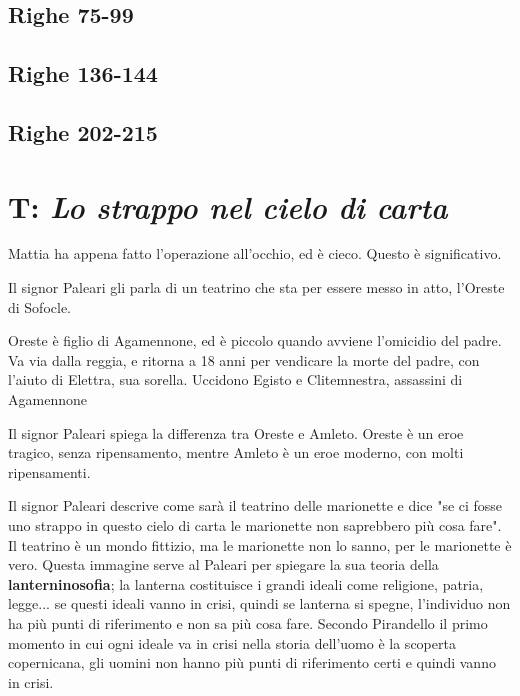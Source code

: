 \subsection{Righe 75-99}

\subsection{Righe 136-144}

\subsection{Righe 202-215}

\section{T: \textit{Lo strappo nel cielo di carta}}

Mattia ha appena fatto l’operazione all’occhio, ed è cieco. Questo è significativo.

Il signor Paleari gli parla di un teatrino che sta per essere messo in atto, l’Oreste di Sofocle.

Oreste è figlio di Agamennone, ed è piccolo quando avviene l’omicidio del padre. Va via dalla reggia, e ritorna a 18 anni per vendicare la morte del padre, con l’aiuto di Elettra, sua sorella. Uccidono Egisto e Clitemnestra, assassini di Agamennone

Il signor Paleari spiega la differenza tra Oreste e Amleto. Oreste è un eroe tragico, senza ripensamento, mentre Amleto è un eroe moderno, con molti ripensamenti.

Il signor Paleari descrive come sarà il teatrino delle marionette e dice "se ci fosse uno strappo in questo cielo di carta le marionette non saprebbero più cosa fare". Il teatrino è un mondo fittizio,  ma le marionette non lo sanno, per le marionette è vero.
Questa immagine serve al Paleari per spiegare la sua teoria della \textbf{lanterninosofia}; la lanterna costituisce i grandi ideali come religione, patria, legge... se questi ideali vanno in crisi, quindi se lanterna si spegne, l'individuo non ha più punti di riferimento e non sa più cosa fare.
Secondo Pirandello il primo momento in cui ogni ideale va in crisi nella storia dell'uomo è la scoperta copernicana, gli uomini non hanno più punti di riferimento certi e quindi vanno in crisi.

